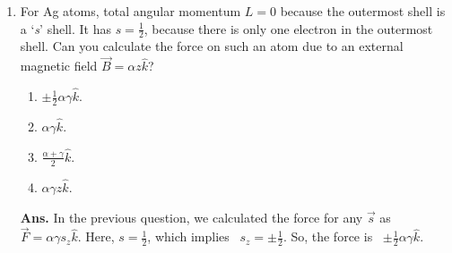 \documentclass[12pt]{article}
\newcommand\half{\frac{1}{2}}
\newcommand\hs{\hat{S}}
\newcommand\tbf[1]{\textbf{#1}}
\newcommand\tans{\tbf{Ans. }}
\newcommand\sg{Stern-Gerlach }
\newcommand\h[1]{\hat{#1}}
\begin{document}
\begin{enumerate}[\bf 1.]
$$\begin{aligned}
    &= \alpha \gamma \left[ 0 + 0 + \hs_z \hat{k} \right] = \alpha \gamma \hs_z \hat{k}.
   \end{aligned}
$$\vspace{1cm}
\newpage
In a \sg experiment, a non-uniform magnetic field is used. The setup is as follows:
\vskip 7cm %
In \sg experiment, if we send a beam of charged particles through the apparatus, then the Lorentz force arising from the interaction of the charged particles with the non-uniform magnetic field will be quite complicated, and we do not want to add additional complications to the experiment. So, typically neutral atoms with single unpaired electrons (for example, silver atoms) are used as the constituents of the beam.
\vspace{1cm}
\item For Ag atoms, total angular momentum $L = 0$ because the outermost shell is a `{\it s}' shell. It has $ s = \half $, because there is only one electron in the outermost shell. Can you calculate the force on such an atom due to an external magnetic field $\vec{B} = \alpha z \hat{k}$? 
\begin{enumerate}[\bf I.]
	\item $\pm\half\alpha\gamma\hat{k}$.
	\item $\alpha\gamma\hat{k}$.
	\item $\frac{\alpha+\gamma}{2}\h{k}$.
	\item $\alpha\gamma z \h{k}$.
	
\end{enumerate}
\vspace{0.5cm}
\tans In the previous question, we calculated the force for any $\vec{s}$ as $\vec{F} = \alpha \gamma s_z \h{k}$. Here, $s=\half$, which implies~ $s_z = \pm\half$. So, the force is ~$\pm\half\alpha\gamma\hat{k}$. 


\end{enumerate}
\end{document}
